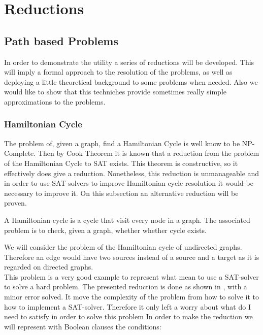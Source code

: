 \part{Reductions} %

\label{chap:3}

\chapter{Path based Problems}


In order to demonstrate the utility a series of reductions will be developed. This will imply a formal approach to the resolution of the problems, as well as deploying a little theoretical background to some problems when needed. Also we would like to show that this techniches provide sometimes really simple approximations to the problems.\\

\section{Hamiltonian Cycle}


The problem of, given a graph, find a Hamiltonian Cycle is well know to be NP-Complete. Then by Cook Theorem it is known that a reduction from the problem of the Hamiltonian Cycle to SAT exists. This theorem is constructive, so it effectively does give a reduction. Nonetheless, this reduction is unmanageable and in order to use SAT-solvers to improve Hamiltonian cycle resolution it would be necessary to improve it. On this subsection an alternative reduction will be proven.

\begin{definition}
  A Hamiltonian cycle is a cycle that visit every node in a graph. The associated problem is to check, given a graph, whether whether cycle exists.
\end{definition}

We will consider the problem of the Hamiltonian cycle of undirected graphs. Therefore an edge would have two sources instead of a source and a target as it is regarded on directed graphs.\\

This problem is a very good example to represent what mean to use a SAT-solver to solve a hard problem. The presented reduction is done as shown in \cite{49593}, with a minor error solved. It move the complexity of the problem from how to solve it to how to implement a SAT-solver. Therefore it only left a worry about what do I need to satisfy in order to solve this problem In order to make the reduction we will represent with Boolean clauses the conditions:\\

